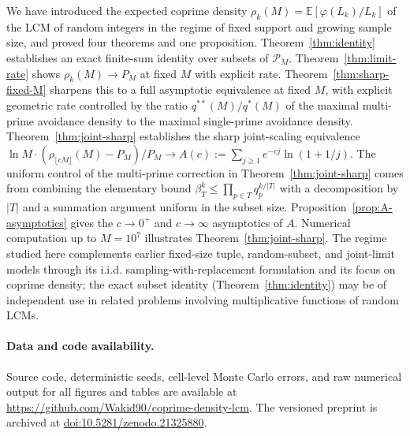 \documentclass[11pt]{article}
\theoremstyle{remark}
\newcommand{\EE}{\mathbb{E}}
\newcommand{\PM}{\mathcal{P}_M}
\begin{document}
We have introduced the expected coprime density $\rho_k(M) = \EE[\varphi(L_k)/L_k]$ of the LCM of random integers in the regime of fixed support and growing sample size, and proved four theorems and one proposition. Theorem~\ref{thm:identity} establishes an exact finite-sum identity over subsets of $\PM$. Theorem~\ref{thm:limit-rate} shows $\rho_k(M) \to P_M$ at fixed $M$ with explicit rate. Theorem~\ref{thm:sharp-fixed-M} sharpens this to a full asymptotic equivalence at fixed $M$, with explicit geometric rate controlled by the ratio $q^{**}(M)/q^*(M)$ of the maximal multi-prime avoidance density to the maximal single-prime avoidance density. Theorem~\ref{thm:joint-sharp} establishes the sharp joint-scaling equivalence $\ln M \cdot (\rho_{\lfloor cM \rfloor}(M) - P_M)/P_M \to A(c) := \sum_{j \geq 1} e^{-cj} \ln(1 + 1/j)$. The uniform control of the multi-prime correction in Theorem~\ref{thm:joint-sharp} comes from combining the elementary bound $\beta_T^k \leq \prod_{p \in T} q_p^{k/|T|}$ with a decomposition by $|T|$ and a summation argument uniform in the subset size. Proposition~\ref{prop:A-asymptotics} gives the $c \to 0^+$ and $c \to \infty$ asymptotics of $A$. Numerical computation up to $M = 10^7$ illustrates Theorem~\ref{thm:joint-sharp}. The regime studied here complements earlier fixed-size tuple, random-subset, and joint-limit models through its i.i.d. sampling-with-replacement formulation and its focus on coprime density; the exact subset identity (Theorem~\ref{thm:identity}) may be of independent use in related problems involving multiplicative functions of random LCMs.

\paragraph{Data and code availability.}
Source code, deterministic seeds, cell-level Monte Carlo errors, and raw numerical output for all figures and tables are available at \url{https://github.com/Wakid90/coprime-density-lcm}. The versioned preprint is archived at \href{https://doi.org/10.5281/zenodo.21325880}{doi:10.5281/zenodo.21325880}.
\end{document}
